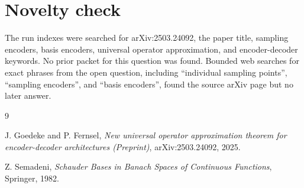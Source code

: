\documentclass[11pt]{article}
\begin{document}
\section*{Novelty check}

The run indexes were searched for arXiv:2503.24092, the paper title, sampling
encoders, basis encoders, universal operator approximation, and encoder-decoder
keywords.  No prior packet for this question was found.  Bounded web searches
for exact phrases from the open question, including ``individual sampling
points'', ``sampling encoders'', and ``basis encoders'', found the source
arXiv page but no later answer.

\begin{thebibliography}{9}

J. Goedeke and P. Fernsel,
\emph{New universal operator approximation theorem for encoder-decoder
architectures (Preprint)}, arXiv:2503.24092, 2025.

Z. Semadeni,
\emph{Schauder Bases in Banach Spaces of Continuous Functions},
Springer, 1982.

\end{thebibliography}
\end{document}
